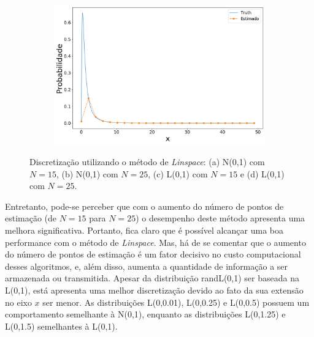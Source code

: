 \begin{figure}[H]
\begin{subfigure}[b]{0.45\textwidth}
		\caption{}
		\label{fig:lin_log15}
	\end{subfigure}
	\hfill
	\begin{subfigure}[b]{0.45\textwidth}
		\centering 
		\includegraphics[width=\linewidth]{./figuras/Linspace_lognormal_25}
		\caption{}
		\label{fig:lin_log25}
	\end{subfigure}
	
	\caption{Discretização utilizando o método de \textit{Linspace}: (a) N(0,1) com $N = 15$, (b) N(0,1) com $N = 25$, (c) L(0,1) com $N = 15$ e (d) L(0,1) com $N = 25$.}
	\label{fig:normlin}
\end{figure}




Entretanto, pode-se perceber que com o aumento do número de pontos de estimação (de $N = 15$ para $N = 25$) o desempenho deste método apresenta uma melhora significativa. Portanto, fica claro que é possível alcançar uma boa performance com o método de \textit{Linspace}. Mas, há de se comentar que o aumento do número de pontos de estimação é um fator decisivo no custo computacional desses algoritmos, e, além disso, aumenta a quantidade de informação a ser armazenada ou transmitida. Apesar da distribuição randL(0,1) ser baseada na L(0,1), está apresenta uma melhor discretização devido ao fato da sua extensão no eixo $ x $ ser menor. As distribuições L(0,0.01), L(0,0.25) e L(0,0.5) possuem um comportamento semelhante à N(0,1), enquanto as distribuições L(0,1.25) e L(0,1.5) semelhantes à L(0,1).%


